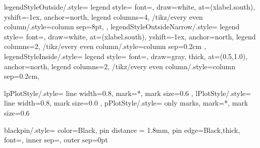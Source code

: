 


\pgfplotsset
{
	legendStyleOutside/.style=
	{
		legend style=
		{
			font=\inplottext,
			draw=white,
			at={(xlabel.south)},
			yshift=-1ex,
			anchor=north,
			legend columns=4,
			/tikz/every even column/.style={column sep=8pt},
		}
	},
	legendStyleOutsideNarrow/.style=
	{
		legend style=
		{
			font=\inplottext,
			draw=white,
			at={(xlabel.south)},
			yshift=-1ex,
			anchor=north,
			legend columns=2,
			/tikz/every even column/.style={column sep=0.2cm}
		}
	},
	legendStyleInside/.style=
	{
		legend style=
		{
			font=\inplottext,
			draw=gray,
			thick,
			at={(0.5,1.0)},
			anchor=north,
			legend columns=2,
			/tikz/every even column/.style={column sep=0.2cm},
		}
	}
}



\pgfplotsset
{
	lpPlotStyle/.style=
	{
		line width=0.8,
		mark=*,
		mark size=0.6
	},
	lPlotStyle/.style=
	{
		line width=0.8,
		mark size=0.0
	},
	pPlotStyle/.style=
	{
		only marks,
		mark=*,
		mark size=0.6
	}
}


\tikzset
{
	blackpin/.style=
	{
		color=Black,
		pin distance = 1.8mm,
		pin edge={Black,thick},
		font=\inplottext,
		inner sep=\TikzScaling*2.5pt,
		outer sep=0pt %
	}
}





